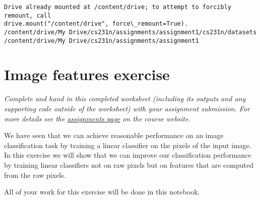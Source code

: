 \documentclass[11pt]{article}
\begin{document}
    \begin{Verbatim}[commandchars=\\\{\}]
Drive already mounted at /content/drive; to attempt to forcibly remount, call
drive.mount("/content/drive", force\_remount=True).
/content/drive/My Drive/cs231n/assignments/assignment1/cs231n/datasets
/content/drive/My Drive/cs231n/assignments/assignment1
    \end{Verbatim}

    \hypertarget{image-features-exercise}{%
\section{Image features exercise}\label{image-features-exercise}}

\emph{Complete and hand in this completed worksheet (including its
outputs and any supporting code outside of the worksheet) with your
assignment submission. For more details see the
\href{http://vision.stanford.edu/teaching/cs231n/assignments.html}{assignments
page} on the course website.}

We have seen that we can achieve reasonable performance on an image
classification task by training a linear classifier on the pixels of the
input image. In this exercise we will show that we can improve our
classification performance by training linear classifiers not on raw
pixels but on features that are computed from the raw pixels.

All of your work for this exercise will be done in this notebook.
\end{document}
